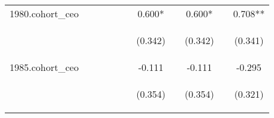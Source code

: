 \begin{center}
\begin{tabular}{lcccccccccc}
1980.cohort\_ceo &  &  &  &  &  & 0.600* &  & 0.600* &  & 0.708** \\
\vspace{4pt} & \begin{footnotesize}\end{footnotesize} & \begin{footnotesize}\end{footnotesize} & \begin{footnotesize}\end{footnotesize} & \begin{footnotesize}\end{footnotesize} & \begin{footnotesize}\end{footnotesize} & \begin{footnotesize}(0.342)\end{footnotesize} & \begin{footnotesize}\end{footnotesize} & \begin{footnotesize}(0.342)\end{footnotesize} & \begin{footnotesize}\end{footnotesize} & \begin{footnotesize}(0.341)\end{footnotesize} \\
1985.cohort\_ceo &  &  &  &  &  & -0.111 &  & -0.111 &  & -0.295 \\
\vspace{4pt} & \begin{footnotesize}\end{footnotesize} & \begin{footnotesize}\end{footnotesize} & \begin{footnotesize}\end{footnotesize} & \begin{footnotesize}\end{footnotesize} & \begin{footnotesize}\end{footnotesize} & \begin{footnotesize}(0.354)\end{footnotesize} & \begin{footnotesize}\end{footnotesize} & \begin{footnotesize}(0.354)\end{footnotesize} & \begin{footnotesize}\end{footnotesize} & \begin{footnotesize}(0.321)\end{footnotesize} \\

\end{tabular}
\end{center}
